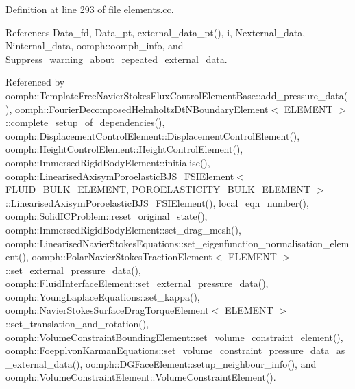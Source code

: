 Definition at line 293 of file elements.\+cc.



References Data\+\_\+fd, Data\+\_\+pt, external\+\_\+data\+\_\+pt(), i, Nexternal\+\_\+data, Ninternal\+\_\+data, oomph\+::oomph\+\_\+info, and Suppress\+\_\+warning\+\_\+about\+\_\+repeated\+\_\+external\+\_\+data.



Referenced by oomph\+::\+Template\+Free\+Navier\+Stokes\+Flux\+Control\+Element\+Base\+::add\+\_\+pressure\+\_\+data(), oomph\+::\+Fourier\+Decomposed\+Helmholtz\+Dt\+N\+Boundary\+Element$<$ E\+L\+E\+M\+E\+N\+T $>$\+::complete\+\_\+setup\+\_\+of\+\_\+dependencies(), oomph\+::\+Displacement\+Control\+Element\+::\+Displacement\+Control\+Element(), oomph\+::\+Height\+Control\+Element\+::\+Height\+Control\+Element(), oomph\+::\+Immersed\+Rigid\+Body\+Element\+::initialise(), oomph\+::\+Linearised\+Axisym\+Poroelastic\+B\+J\+S\+\_\+\+F\+S\+I\+Element$<$ F\+L\+U\+I\+D\+\_\+\+B\+U\+L\+K\+\_\+\+E\+L\+E\+M\+E\+N\+T, P\+O\+R\+O\+E\+L\+A\+S\+T\+I\+C\+I\+T\+Y\+\_\+\+B\+U\+L\+K\+\_\+\+E\+L\+E\+M\+E\+N\+T $>$\+::\+Linearised\+Axisym\+Poroelastic\+B\+J\+S\+\_\+\+F\+S\+I\+Element(), local\+\_\+eqn\+\_\+number(), oomph\+::\+Solid\+I\+C\+Problem\+::reset\+\_\+original\+\_\+state(), oomph\+::\+Immersed\+Rigid\+Body\+Element\+::set\+\_\+drag\+\_\+mesh(), oomph\+::\+Linearised\+Navier\+Stokes\+Equations\+::set\+\_\+eigenfunction\+\_\+normalisation\+\_\+element(), oomph\+::\+Polar\+Navier\+Stokes\+Traction\+Element$<$ E\+L\+E\+M\+E\+N\+T $>$\+::set\+\_\+external\+\_\+pressure\+\_\+data(), oomph\+::\+Fluid\+Interface\+Element\+::set\+\_\+external\+\_\+pressure\+\_\+data(), oomph\+::\+Young\+Laplace\+Equations\+::set\+\_\+kappa(), oomph\+::\+Navier\+Stokes\+Surface\+Drag\+Torque\+Element$<$ E\+L\+E\+M\+E\+N\+T $>$\+::set\+\_\+translation\+\_\+and\+\_\+rotation(), oomph\+::\+Volume\+Constraint\+Bounding\+Element\+::set\+\_\+volume\+\_\+constraint\+\_\+element(), oomph\+::\+Foepplvon\+Karman\+Equations\+::set\+\_\+volume\+\_\+constraint\+\_\+pressure\+\_\+data\+\_\+as\+\_\+external\+\_\+data(), oomph\+::\+D\+G\+Face\+Element\+::setup\+\_\+neighbour\+\_\+info(), and oomph\+::\+Volume\+Constraint\+Element\+::\+Volume\+Constraint\+Element().

\mbox{\label{classoomph_1_1GeneralisedElement_a540a363b1ea07065dd2ed1b223d0e4c4}} 
